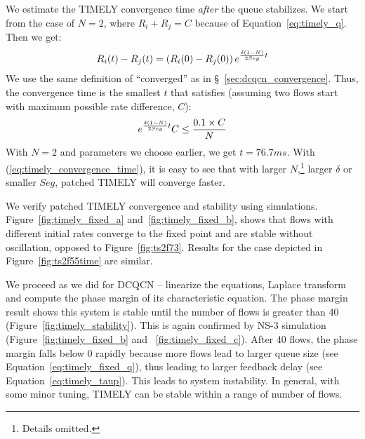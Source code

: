  We estimate the TIMELY convergence time {\em after}
the queue stabilizes. We start from the case of $N=2$, where $R_i + R_j = C$
because of Equation~\ref{eq:timely_q}.
Then we get:
\begin{equation}
\small
{R_i}(t) - {R_j}(t) = \left( {{R_i}(0) - {R_j}(0)} \right){e^{\frac{{\delta (1 - N)}}{{2Seg}}t}}
\end{equation}
We use the same definition of ``converged'' as in
\S~\ref{sec:dcqcn_convergence}. Thus, the convergence
time is the smallest $t$ that satisfies (assuming two flows start with maximum possible rate difference, $C$):
\begin{equation}
\small
{e^{\frac{{\delta (1 - N)}}{{2Seg}}t}}C \le \frac{{0.1 \times C}}{N}
\label{eq:timely_convergence_time}
\end{equation}
With $N=2$ and parameters we choose earlier, we get $t = 76.7ms$. With (\ref{eq:timely_convergence_time}), it is easy to see that
with larger $N$,\footnote{Details omitted.} larger $\delta$ or smaller $Seg$, patched TIMELY will converge faster.

We verify patched TIMELY convergence and stability using simulations.
Figure~\ref{fig:timely_fixed_a} and~\ref{fig:timely_fixed_b}, shows that flows
with different initial rates converge to the fixed point and are stable without
oscillation, opposed to Figure~\ref{fig:ts2f73}. Results for the case depicted
in Figure~\ref{fig:ts2f55time} are similar.

 We proceed as we did for DCQCN -- linearize the equations,
Laplace transform and compute the phase margin of its characteristic equation.
The phase margin result shows this system is stable until the number of flows is
greater than 40 (Figure~\ref{fig:timely_stability}).  This is again confirmed by
NS-3 simulation (Figure~\ref{fig:timely_fixed_b} and ~\ref{fig:timely_fixed_c}).
After 40 flows, the phase margin falls below 0 rapidly because more flows lead
to larger queue size (see Equation~\ref{eq:timely_fixed_q}), thus leading to
larger feedback delay (see Equation~\ref{eq:timely_taup}).  This leads to system
instability. In general, with some minor tuning, TIMELY can be stable within a
range of number of flows.
